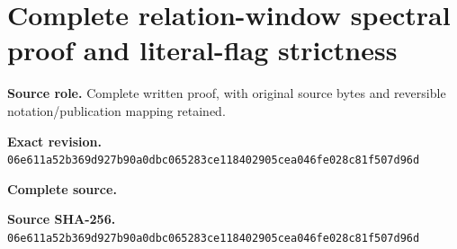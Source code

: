 \begingroup
\sloppy
\small
\section{Complete relation-window spectral proof and literal-flag strictness}
\noindent\textbf{Source role.} Complete written proof, with original source bytes and reversible notation/publication mapping retained.\par
\noindent\textbf{Exact revision.} \nolinkurl{06e611a52b369d927b90a0dbc065283ce118402905cea046fe028c81f507d96d}\par
\noindent\textbf{Complete source.} \par
\noindent\textbf{Source SHA-256.} \nolinkurl{06e611a52b369d927b90a0dbc065283ce118402905cea046fe028c81f507d96d}\par\medskip

\endgroup
